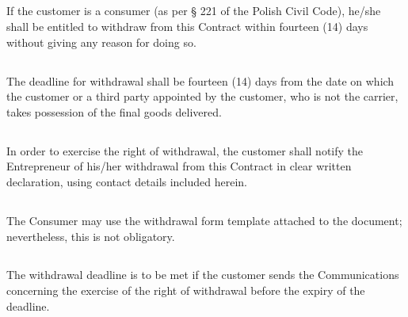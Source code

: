 
			\subsection{} If the customer is a consumer (as per § 221 of the Polish Civil Code), he/she shall be entitled to withdraw from this Contract within fourteen (14) days without giving any reason for doing so.
			
			\subsection{} The deadline for withdrawal shall be fourteen (14) days from the date on which the customer or a third party appointed by the customer, who is not the carrier, takes possession of the final goods delivered.
			
			\subsection{} In order to exercise the right of withdrawal, the customer shall notify the Entrepreneur \companyname of his/her withdrawal from this Contract in clear written declaration, using contact details included herein.

			\subsection{} The Consumer may use the withdrawal form template attached to the document; nevertheless, this is not obligatory.

			\subsection{} The withdrawal deadline is to be met if the customer sends the Communications concerning the exercise of the right of withdrawal before the expiry of the deadline.
	
